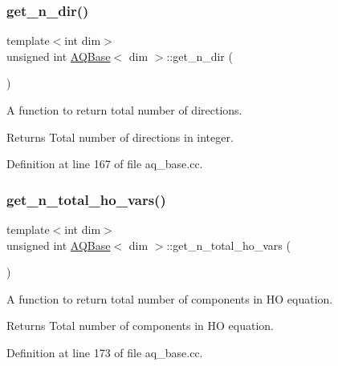 \mbox{\label{class_a_q_base_a803528777761efa898b046e374008744}} 
\subsubsection{\texorpdfstring{get\+\_\+n\+\_\+dir()}{get\_n\_dir()}}
{\footnotesize\ttfamily template$<$int dim$>$ \\
unsigned int \hyperlink{class_a_q_base}{A\+Q\+Base}$<$ dim $>$\+::get\+\_\+n\+\_\+dir (\begin{DoxyParamCaption}{ }\end{DoxyParamCaption})}

A function to return total number of directions.

\begin{DoxyReturn}{Returns}
Total number of directions in integer. 
\end{DoxyReturn}


Definition at line 167 of file aq\+\_\+base.\+cc.

\mbox{\label{class_a_q_base_af367f668495d928c27a985b081868c6c}} 
\subsubsection{\texorpdfstring{get\+\_\+n\+\_\+total\+\_\+ho\+\_\+vars()}{get\_n\_total\_ho\_vars()}}
{\footnotesize\ttfamily template$<$int dim$>$ \\
unsigned int \hyperlink{class_a_q_base}{A\+Q\+Base}$<$ dim $>$\+::get\+\_\+n\+\_\+total\+\_\+ho\+\_\+vars (\begin{DoxyParamCaption}{ }\end{DoxyParamCaption})}

A function to return total number of components in HO equation.

\begin{DoxyReturn}{Returns}
Total number of components in HO equation. 
\end{DoxyReturn}


Definition at line 173 of file aq\+\_\+base.\+cc.

